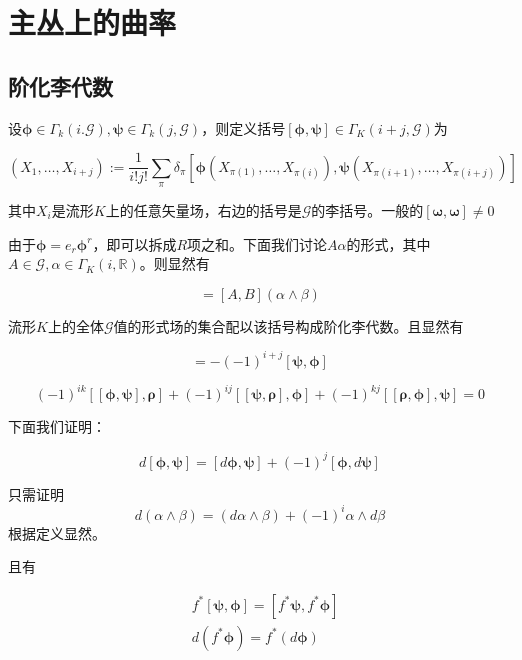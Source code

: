 \documentclass{ctexbook}
\begin{document}
\section{主丛上的曲率}

\subsection{阶化李代数}

设$\bm{\phi}\in\Gamma_k(i.\mathscr{G}),\bm{\psi}\in\Gamma_k(j,\mathscr{G})$，则定义括号$[\bm{\phi},\bm{\psi}]\in\Gamma_K(i+j,\mathscr{G})$为

\begin{equation}
    [\bm{\phi},\bm{\psi}](X_1,\dots,X_{i+j}):=\frac{1}{i!j!}\sum_{\pi}\delta_\pi[\bm{\phi}(X_{\pi(1)},\dots,X_{\pi(i)}),\bm{\psi}(X_{\pi(i+1)},\dots,X_{\pi(i+j)})]
\end{equation}

其中$X_i$是流形$K$上的任意矢量场，右边的括号是$\mathscr{G}$的李括号。一般的$[\bm{\omega},\bm{\omega}]\neq0$

由于$\bm{\phi}=e_r\bm{\phi}^r$，即可以拆成$R$项之和。下面我们讨论$A\alpha$的形式，其中$A\in\mathscr{G},\alpha\in\Gamma_K(i,\mathbb{R})$。则显然有

\begin{equation}
    [A\alpha,B\beta]=[A,B](\alpha\wedge\beta)
\end{equation}

流形$K$上的全体$\mathscr{G}$值的形式场的集合配以该括号构成阶化李代数。且显然有

\begin{equation}
    [\bm{\phi},\bm{\psi}]=-(-1)^{i+j}[\bm{\psi},\bm{\phi}]
\end{equation}

\begin{equation}
    (-1)^{i k}[[\bm{\phi},\bm{\psi}],\bm{\rho}]+(-1)^{ij}[[\bm{\psi},\bm{\rho}],\bm{\phi}]+(-1)^{kj}[[\bm{\rho},\bm{\phi}],\bm{\psi}]=0
\end{equation}

下面我们证明：

\begin{equation}
    d[\bm{\phi},\bm{\psi}]=[d\bm{\phi},\bm{\psi}]+(-1)^j[\bm{\phi},d\bm{\psi}]
\end{equation}

只需证明\[d(\alpha\wedge\beta)=(d\alpha\wedge\beta)+(-1)^i\alpha\wedge d\beta\]根据定义显然。

且有

\begin{equation}
    \begin{split}
        &f^{*}[\bm{\psi},\bm{\phi}]=[f^{*}\bm{\psi},f^{*}\bm{\phi}]\\
        &d(f^{*}\bm{\phi})=f^{*}(d\bm{\phi})\\
    \end{split}
\end{equation}
\end{document}
